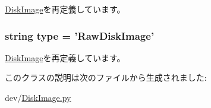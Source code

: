 \hyperlink{classDiskImage_1_1DiskImage_a17da7064bc5c518791f0c891eff05fda}{DiskImage}を再定義しています。\hypertarget{classDiskImage_1_1RawDiskImage_acce15679d830831b0bbe8ebc2a60b2ca}{
\subsubsection[{type}]{\setlength{\rightskip}{0pt plus 5cm}string {\bf type} = '{\bf RawDiskImage}'}}
\label{classDiskImage_1_1RawDiskImage_acce15679d830831b0bbe8ebc2a60b2ca}


\hyperlink{classDiskImage_1_1DiskImage_acce15679d830831b0bbe8ebc2a60b2ca}{DiskImage}を再定義しています。

このクラスの説明は次のファイルから生成されました:\begin{DoxyCompactItemize}
\item 
dev/\hyperlink{DiskImage_8py}{DiskImage.py}\end{DoxyCompactItemize}
